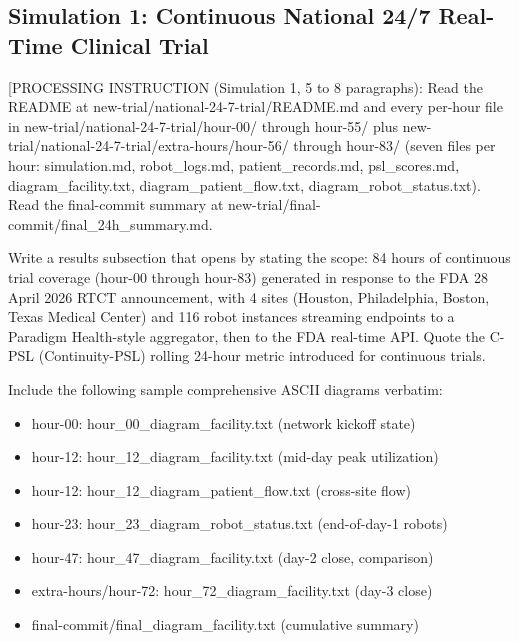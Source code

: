 
\subsection{Simulation 1: Continuous National 24/7 Real-Time Clinical Trial}
\label{sec:results-sim1}

[PROCESSING INSTRUCTION (Simulation 1, 5 to 8 paragraphs): Read the
README at new-trial/national-24-7-trial/README.md and every per-hour file
in new-trial/national-24-7-trial/hour-00/ through hour-55/ plus
new-trial/national-24-7-trial/extra-hours/hour-56/ through hour-83/
(seven files per hour: simulation.md, robot\_logs.md, patient\_records.md,
psl\_scores.md, diagram\_facility.txt, diagram\_patient\_flow.txt,
diagram\_robot\_status.txt). Read the final-commit summary at
new-trial/final-commit/final\_24h\_summary.md.

Write a results subsection that opens by stating the scope: 84 hours of
continuous trial coverage (hour-00 through hour-83) generated in response
to the FDA 28 April 2026 RTCT announcement, with 4 sites (Houston,
Philadelphia, Boston, Texas Medical Center) and 116 robot instances
streaming endpoints to a Paradigm Health-style aggregator, then to the
FDA real-time API. Quote the C-PSL (Continuity-PSL) rolling 24-hour
metric introduced for continuous trials.

Include the following sample comprehensive ASCII diagrams verbatim:
\begin{itemize}[leftmargin=*]
\item hour-00: hour\_00\_diagram\_facility.txt (network kickoff state)
\item hour-12: hour\_12\_diagram\_facility.txt (mid-day peak utilization)
\item hour-12: hour\_12\_diagram\_patient\_flow.txt (cross-site flow)
\item hour-23: hour\_23\_diagram\_robot\_status.txt (end-of-day-1 robots)
\item hour-47: hour\_47\_diagram\_facility.txt (day-2 close, comparison)
\item extra-hours/hour-72: hour\_72\_diagram\_facility.txt (day-3 close)
\item final-commit/final\_diagram\_facility.txt (cumulative summary)
\end{itemize}

